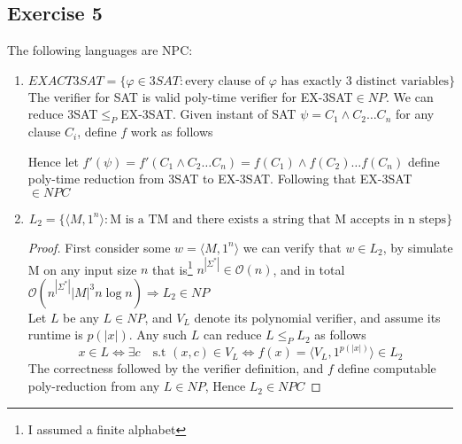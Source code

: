 \documentclass[12pt]{article}
\begin{document}
\subsection{Exercise 5} 
 The following languages are NPC:
\begin{enumerate}[label=(\alph*)]
\item \[ EXACT3SAT=\{\varphi \in 3SAT:\text{every clause of $\varphi$ has exactly 3 distinct variables}\}
\]
The verifier for SAT is valid poly-time verifier for   EX-3SAT$\in NP $. We can reduce 3SAT$\le_P$EX-3SAT. Given instant of SAT $\psi=C_1\wedge C_2 \dots C_n$  for any clause $C_i$, define $f$  work as follows
Hence let  $f'(\psi)=f'(C_1\wedge C_2 \dots C_n)=f(C_1)\wedge f(C_2)\dots f(C_n)$ define poly-time reduction from 3SAT to EX-3SAT. Following that EX-3SAT$\in NPC$ 
\item \[ L_2=\{\langle M,1^n \rangle :\text{M is a TM and there exists a string that M accepts in n steps}\}
\]
\begin{proof} 
First consider some $w=\langle M,1^n \rangle $ we can verify that $w\in L_2$, by simulate M on any input size $n$ that is\footnote{ I assumed a finite alphabet } $n^{|\Sigma ^*|}\in \mathcal{O}(n)$, and in total $\mathcal{O}(n^{|\Sigma ^*|} |M|^3n \log n ) \Rightarrow L_2\in NP$\\
Let $L$ be any $L\in NP$, and  $V_L$ denote its polynomial  verifier, and assume its runtime is $p(|x|)$. Any such $L$ can reduce $L\le_P L_2$ as follows
\[x\in L \Leftrightarrow \exists c \quad \text{s.t } (x,c)\in V_L \Leftrightarrow f(x)=\langle V_L,1^{p(|x|)}\rangle\in L_2 
\]
The correctness followed by the verifier definition, and $f$ define computable poly-reduction from any $L\in NP$, Hence $L_2\in NPC$
\end{proof} 
\end{enumerate}
\end{document}
